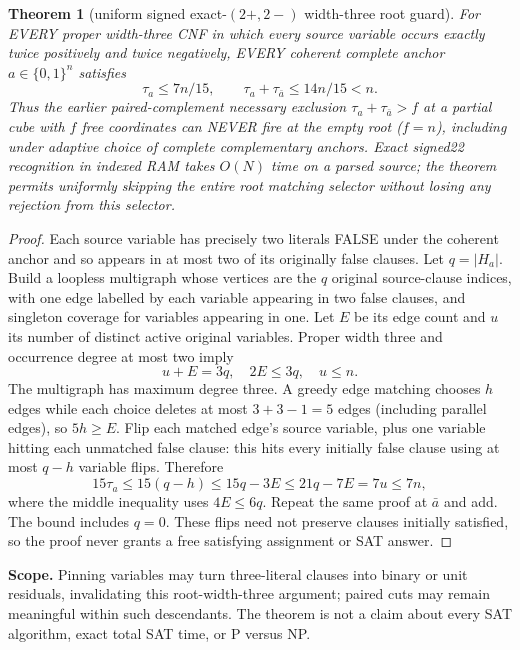 \documentclass[10pt]{article}
\newtheorem{theorem}{Theorem}
\begin{document}
\begin{theorem}[uniform signed exact-$(2+,2-)$ width-three root guard]
For EVERY proper width-three CNF in which every source variable occurs exactly twice positively and twice negatively, EVERY coherent complete anchor $a\in\{0,1\}^n$ satisfies
\[
\boxed{\tau_a\le 7n/15,\qquad \tau_a+\tau_{\bar a}\le14n/15<n.}
\]
Thus the earlier paired-complement necessary exclusion $\tau_a+\tau_{\bar a}>f$ at a partial cube with $f$ free coordinates can NEVER fire at the empty root ($f=n$), including under adaptive choice of complete complementary anchors. Exact signed22 recognition in indexed RAM takes $O(N)$ time on a parsed source; the theorem permits uniformly skipping the entire root matching selector without losing any rejection from this selector.
\end{theorem}
\begin{proof}
Each source variable has precisely two literals FALSE under the coherent anchor and so appears in at most two of its originally false clauses. Let $q=|H_a|$. Build a loopless multigraph whose vertices are the $q$ original source-clause indices, with one edge labelled by each variable appearing in two false clauses, and singleton coverage for variables appearing in one. Let $E$ be its edge count and $u$ its number of distinct active original variables. Proper width three and occurrence degree at most two imply
\[
u+E=3q,\quad 2E\le3q,\quad u\le n.
\]
The multigraph has maximum degree three. A greedy edge matching chooses $h$ edges while each choice deletes at most $3+3-1=5$ edges (including parallel edges), so $5h\ge E$. Flip each matched edge's source variable, plus one variable hitting each unmatched false clause: this hits every initially false clause using at most $q-h$ variable flips. Therefore
\[
15\tau_a\le 15(q-h)\le15q-3E
\le21q-7E=7u\le7n,
\]
where the middle inequality uses $4E\le6q$. Repeat the same proof at $\bar a$ and add. The bound includes $q=0$. These flips need not preserve clauses initially satisfied, so the proof never grants a free satisfying assignment or SAT answer.
\end{proof}
\noindent\textbf{Scope.} Pinning variables may turn three-literal clauses into binary or unit residuals, invalidating this root-width-three argument; paired cuts may remain meaningful within such descendants. The theorem is not a claim about every SAT algorithm, exact total SAT time, or P versus NP.
\end{document}
